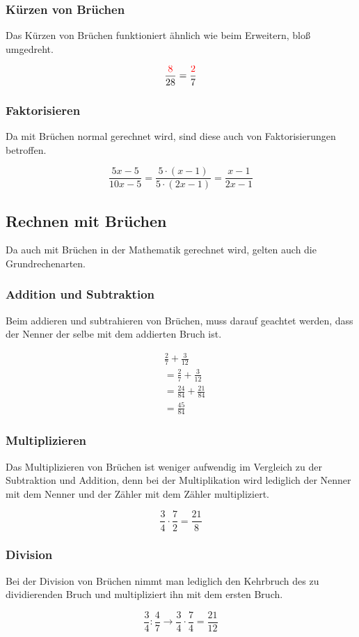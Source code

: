 \subsubsection{Kürzen von Brüchen}
Das Kürzen von Brüchen funktioniert ähnlich wie beim Erweitern, bloß umgedreht.

\begin{beispiel}
	\[\frac{\color{red}8}{28}=\frac{\color{red}2}{7}\]
\end{beispiel}

\subsubsection{Faktorisieren} Da mit Brüchen normal gerechnet wird, sind diese auch von Faktorisierungen betroffen. 

\begin{beispiel}
	\[\frac{5x-5}{10x-5}=\frac{5\cdot(x-1)}{5\cdot(2x-1)}=\frac{x-1}{2x-1}\]
\end{beispiel}
\subsection{Rechnen mit Brüchen}
Da auch mit Brüchen in der Mathematik gerechnet wird, gelten auch die Grundrechenarten.
\subsubsection{Addition und Subtraktion} Beim addieren und subtrahieren von Brüchen, muss darauf geachtet werden, dass der Nenner der selbe mit dem addierten Bruch ist. 

\begin{beispiel}
	\begin{align*}
		&\frac{2}{7}+\frac{3}{12}\\
		&=\frac{2}{7}+\frac{3}{12}\\
		&= \frac{24}{84}+\frac{21}{84}\\
		&= \frac{45}{84}
	\end{align*}	
\end{beispiel}
\subsubsection{Multiplizieren} Das Multiplizieren von Brüchen ist weniger aufwendig im Vergleich zu der Subtraktion und Addition, denn bei der Multiplikation wird lediglich der Nenner mit dem Nenner und der Zähler mit dem Zähler multipliziert.

\begin{beispiel}
	\[\frac{3}{4}\cdot\frac{7}{2}=\frac{21}{8}\]
\end{beispiel}
\subsubsection{Division} Bei der Division von Brüchen nimmt man lediglich den Kehrbruch des zu dividierenden Bruch und multipliziert ihn mit dem ersten Bruch. 

\begin{beispiel}
	\[\frac{3}{4}:\frac{4}{7} \rightarrow \frac{3}{4}\cdot \frac{7}{4}= \frac{21}{12}\]
\end{beispiel}